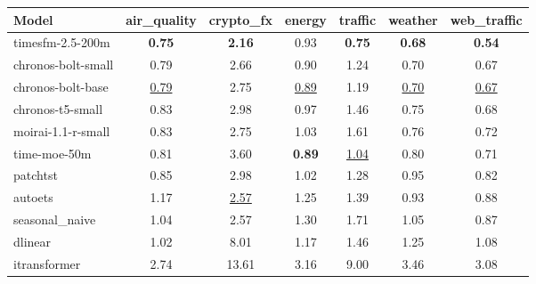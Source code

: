 \begin{tabular}{lcccccc}
\toprule
Model & air\_quality & crypto\_fx & energy & traffic & weather & web\_traffic \\
\midrule
timesfm-2.5-200m & \textbf{0.75} & \textbf{2.16} & 0.93 & \textbf{0.75} & \textbf{0.68} & \textbf{0.54} \\
chronos-bolt-small & 0.79 & 2.66 & 0.90 & 1.24 & 0.70 & 0.67 \\
chronos-bolt-base & \underline{0.79} & 2.75 & \underline{0.89} & 1.19 & \underline{0.70} & \underline{0.67} \\
chronos-t5-small & 0.83 & 2.98 & 0.97 & 1.46 & 0.75 & 0.68 \\
moirai-1.1-r-small & 0.83 & 2.75 & 1.03 & 1.61 & 0.76 & 0.72 \\
time-moe-50m & 0.81 & 3.60 & \textbf{0.89} & \underline{1.04} & 0.80 & 0.71 \\
patchtst & 0.85 & 2.98 & 1.02 & 1.28 & 0.95 & 0.82 \\
autoets & 1.17 & \underline{2.57} & 1.25 & 1.39 & 0.93 & 0.88 \\
seasonal\_naive & 1.04 & 2.57 & 1.30 & 1.71 & 1.05 & 0.87 \\
dlinear & 1.02 & 8.01 & 1.17 & 1.46 & 1.25 & 1.08 \\
itransformer & 2.74 & 13.61 & 3.16 & 9.00 & 3.46 & 3.08 \\
\bottomrule
\end{tabular}
